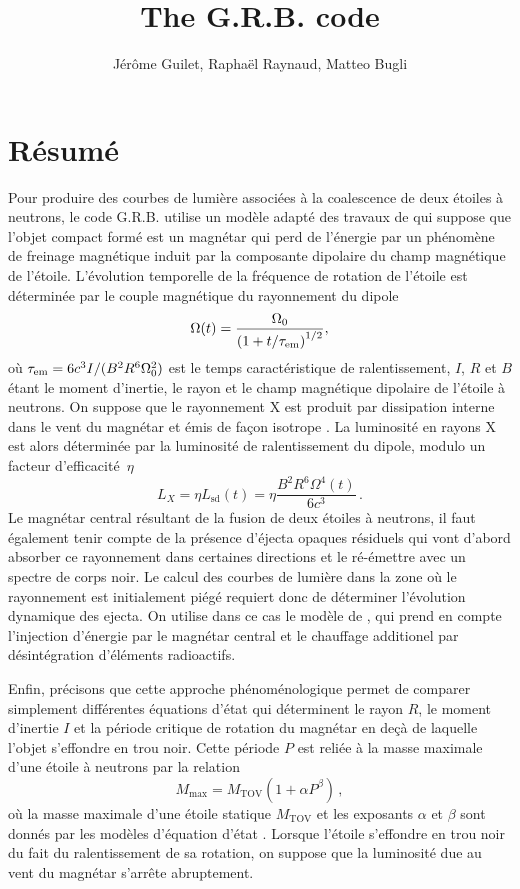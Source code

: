 \documentclass[11pt]{article} %
\title{The G.R.B. code}
\author{J\'er\^ome Guilet, Rapha\"el Raynaud, Matteo Bugli}
\newcommand{\tx}[1]{\textrm{#1}}
\begin{document}
\maketitle

\section{Résumé}
Pour produire des courbes de lumière associées à la coalescence de
deux étoiles à neutrons, le code G.R.B.  utilise un modèle adapté des
travaux de \citet{sun2017} qui suppose que l'objet compact formé est
un magnétar qui perd de l'énergie par un phénomène de freinage
magnétique induit par la composante dipolaire du champ magnétique de
l'étoile. L'évolution temporelle de la fréquence de rotation de
l'étoile est déterminée par le couple magnétique du rayonnement du
dipole
\begin{equation}
\Omega(t) = \frac{\Omega_0}{\left(1 + t/\tau_{\rm em}\right)^{1/2}},
\end{equation}
où $\tau_{\rm em} = 6c^3 I/(B^2 R^6 \Omega_0^2) $ est le temps
caractéristique de ralentissement, $I$, $R$ et $B$ étant le moment
d'inertie, le rayon et le champ magnétique dipolaire de l'étoile à
neutrons. On suppose que le rayonnement X est produit par dissipation
interne dans le vent du magnétar et émis de façon isotrope
\citep{zhang2013}. La luminosité en rayons X est alors déterminée par
la luminosité de ralentissement du dipole, modulo un facteur
d'efficacité~$\eta$
\begin{equation}
  L_X = \eta L_\tx{sd}(t) = \eta \frac{B^2 R^6 \Omega^4(t)}{6 c^3}
  \,.
\end{equation}
Le magnétar central résultant de la fusion de deux étoiles à neutrons,
il faut également tenir compte de la présence d'éjecta opaques
résiduels qui vont d'abord absorber ce rayonnement dans certaines
directions et le ré-émettre avec un spectre de corps noir. Le calcul
des courbes de lumière dans la zone où le rayonnement est initialement
piégé requiert donc de déterminer l'évolution dynamique des ejecta. On
utilise dans ce cas le modèle de \citet{yu2013}, qui prend en compte
l'injection d'énergie par le magnétar central et le chauffage
additionel par désintégration d'éléments radioactifs.

Enfin, précisons que cette approche phénoménologique permet de
comparer simplement différentes équations d'état qui déterminent le
rayon $R$, le moment d'inertie $I$ et la période critique de rotation
du magnétar en deçà de laquelle l'objet s'effondre en trou noir. Cette
période $P$ est reliée à la masse maximale d'une étoile à neutrons par
la relation \citep{lasky2014}
\begin{equation}
  M_\tx{max} = M_\tx{TOV} (1+ \alpha P^\beta)
  \,,
\end{equation}
où la masse maximale d'une étoile statique $M_\text{TOV}$ et les
exposants $\alpha$ et $\beta$ sont donnés par les modèles d'équation
d'état \citep{ai2018}. Lorsque l'étoile s'effondre en trou noir du
fait du ralentissement de sa rotation, on suppose que la luminosité
due au vent du magnétar s'arrête abruptement.
\end{document}
